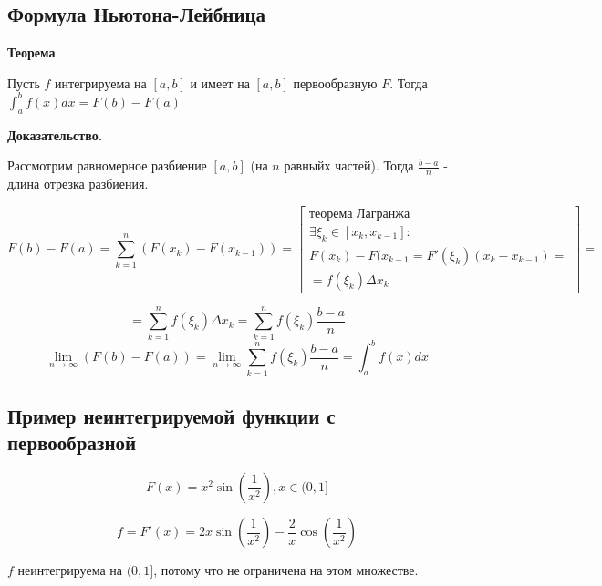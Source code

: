 \documentclass[a4paper]{article}
\begin{document}
\begin{definit}
\subsection*{Формула Ньютона-Лейбница}

\begin{htheorem}\textbf{Теорема}.

Пусть $f$ интегрируема на $[a,b]$ и имеет на $[a,b]$ первообразную $F$. Тогда $\int_a^b f(x)dx = F(b) - F(a)$
\end{htheorem}

\begin{hproof}\textbf{Доказательство.}

Рассмотрим равномерное разбиение $[a,b]$ (на $n$ равныйх частей). Тогда $\frac{b-a}{n}$ - длина отрезка разбиения.

\[
F(b) - F(a) = \sum_{k=1}^n (F(x_k) - F(x_{k-1})) = \begin{bmatrix}
\text{теорема Лагранжа} \\
\exists \xi_k \in [x_k, x_{k-1}]: \\
F(x_k)-F(x_{k-1} = F'(\xi_k)(x_k-x_{k-1}) = \\ = f(\xi_k) \Delta x_k
\end{bmatrix} = 
\]

\[
 = \sum_{k=1}^n f(\xi_k) \Delta x_k = \sum_{k=1}^n f(\xi_k) \frac{b-a}{n}
\]
\[
\lim_{n \rightarrow \infty} (F(b)-F(a)) = \lim_{n \rightarrow \infty} \sum_{k=1}^n f(\xi_k) \frac{b-a}{n} = \int_a^b f(x)dx
\]
\end{hproof}

\end{definit}

\begin{definit}
\subsection*{Пример неинтегрируемой функции с первообразной}

\[
F(x) = x^2 \sin \left( \frac{1}{x^2} \right), x \in (0,1]
\]

\[
f = F'(x) = 2x \sin \left( \frac{1}{x^2} \right) - \frac{2}{x} \cos \left( \frac{1}{x^2} \right)
\]

$f$ неинтегрируема на $(0,1]$, потому что не ограничена на этом множестве.
\end{definit}
\end{document}
